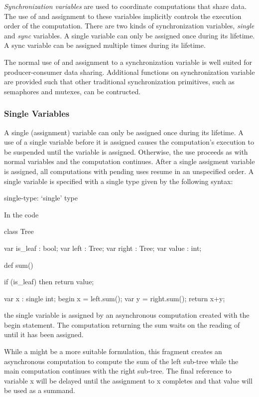 {\em Synchronization variables} are used to coordinate computations
that share data.  The use of and assignment to these variables
implicitly controls the execution order of the computation.  There are
two kinds of synchronization variables, {\em single} and {\em sync}
variables.  A single variable can only be assigned once during its
lifetime.  A sync variable can be assigned multiple times during its
lifetime.

The normal use of and assignment to a synchronization variable is well
suited for producer-consumer data sharing.  Additional functions on
synchronization variable are provided such that other traditional
synchronization primitives, such as semaphores and mutexes, can be
contructed.

\subsubsection{Single Variables}
\label{Single_Variables}

A single (assignment) variable can only be assigned once during its
lifetime.  A use of a single variable before it is assigned causes the
computation's execution to be suspended until the variable is
assigned. Otherwise, the use proceeds as with normal variables and the
computation continues.  After a single assigment variable is assigned,
all computations with pending uses resume in an unspecified order.  A
single variable is specified with a single type given by the following
syntax:
\begin{syntax}
 single-type:
   `single' type
\end{syntax}

\begin{example}
In the code
\begin{chapel}
class Tree {
  var is_leaf : bool;
  var left    : Tree;
  var right   : Tree;
  var value   : int;

  def sum() {
    if (is_leaf) then 
       return value;

    var x : single int;
    begin x = left.sum();
    var y = right.sum();
    return x+y;
  }
}
\end{chapel}
the single variable  is assigned by an asynchronous
computation created with the begin statement. The computation
returning the sum waits on the reading of  until it has been
assigned.

While a  might be a more suitable formulation, this
fragment creates an asynchronous computation to compute the sum of the
left sub-tree while the main computation continues with the right
sub-tree. The final reference to variable x will be delayed until the
assignment to x completes and that value will be used as a summand.
\end{example}

